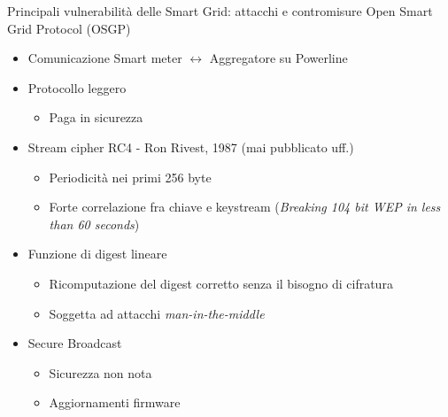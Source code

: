 \begin{frame}{Principali vulnerabilità delle Smart Grid: attacchi e contromisure}
Open Smart Grid Protocol (OSGP)
	\begin{itemize}[<+- | alert@+>]
		\item Comunicazione Smart meter $\leftrightarrow$ Aggregatore su Powerline
		\item Protocollo leggero
		\begin{itemize}
			\item Paga in sicurezza
		\end{itemize}
		\item Stream cipher RC4 - Ron Rivest, 1987 (mai pubblicato uff.)
		\begin{itemize}
			\item Periodicità nei primi 256 byte
			\item Forte correlazione fra chiave e keystream (\textit{Breaking 104 bit WEP in less than 60 seconds})
		\end{itemize}
		\item Funzione di digest lineare
		\begin{itemize}
			\item Ricomputazione del digest corretto senza il bisogno di cifratura
			\item Soggetta ad attacchi \textit{man-in-the-middle}
		\end{itemize}
		\item Secure Broadcast
		\begin{itemize}
			\item Sicurezza non nota
			\item Aggiornamenti firmware
		\end{itemize}
	\end{itemize}
\end{frame}

